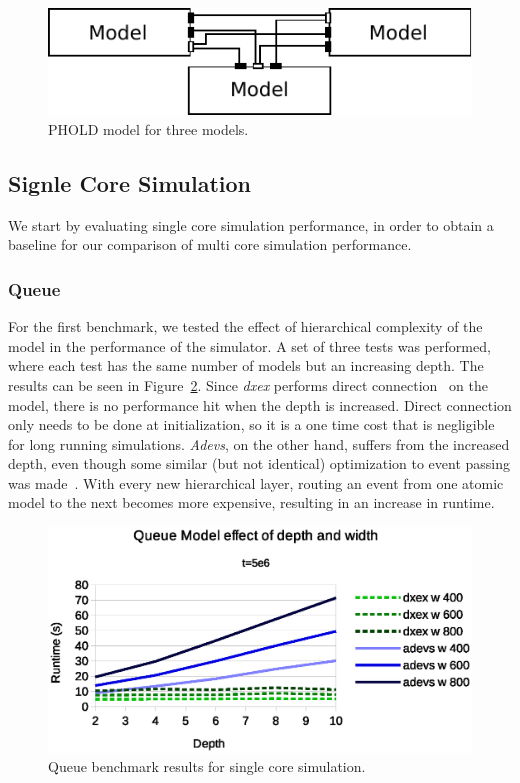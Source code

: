 \begin{figure}
    \center
	\includegraphics[width=\modelfraction\columnwidth]{fig/phold_model.pdf}
	\caption{PHOLD model for three models.}
	\label{fig:PHOLD_model}
\end{figure}

\subsection{Signle Core Simulation}
We start by evaluating single core simulation performance, in order to obtain a baseline for our comparison of multi core simulation performance.

\subsubsection{Queue}
\label{4-seq-Queue}
For the first benchmark, we tested the effect of hierarchical complexity of the model in the performance of the simulator.
A set of three tests was performed, where each test has the same number of models but an increasing depth.
The results can be seen in Figure~\ref{fig:Queue_benchmark_seq}.
Since \textit{dxex} performs direct connection~\cite{SymbolicFlattening} on the model, there is no performance hit when the depth is increased.
Direct connection only needs to be done at initialization, so it is a one time cost that is negligible for long running simulations.
\textit{Adevs}, on the other hand, suffers from the increased depth, even though some similar (but not identical) optimization to event passing was made~\cite{adevs_opt}.
With every new hierarchical layer, routing an event from one atomic model to the next becomes more expensive, resulting in an increase in runtime.

\begin{figure}
	\center
	\includegraphics[width=\columnwidth]{fig/queue_fixed_sequential.eps}
	\caption{Queue benchmark results for single core simulation.}
	\label{fig:Queue_benchmark_seq}
\end{figure}

